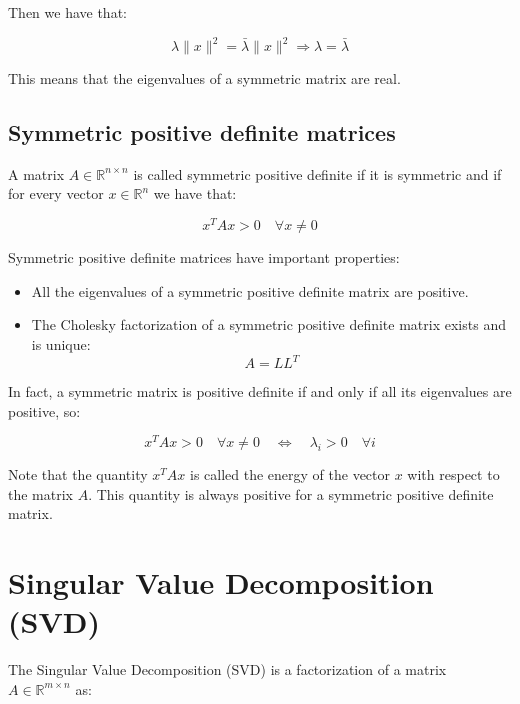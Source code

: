 Then we have that:

\begin{equation}
    \lambda \|x\|^2 = \bar{\lambda} \|x\|^2 \Rightarrow \lambda = \bar{\lambda}
\end{equation}

This means that the eigenvalues of a symmetric matrix are real.

\subsection{Symmetric positive definite matrices}

A matrix $A \in \mathbb{R}^{n \times n}$ is called symmetric positive definite if it is symmetric and if for every vector $x \in \mathbb{R}^n$
we have that:

\begin{equation}
    x^T A x > 0 \quad \forall x \neq 0
\end{equation}

Symmetric positive definite matrices have important properties:

\begin{itemize}
    \item All the eigenvalues of a symmetric positive definite matrix are positive.
    \item The Cholesky factorization of a symmetric positive definite matrix exists and is unique:
    \begin{equation}
        A = L L^T
    \end{equation}
\end{itemize}

In fact, a symmetric matrix is positive definite if and only if all its eigenvalues are positive, so:

\begin{equation}
    x^T A x > 0 \quad \forall x \neq 0 \quad \Leftrightarrow \quad \lambda_i > 0 \quad \forall i
\end{equation}

Note that the quantity $x^T A x$ is called the energy of the vector $x$ with respect to the matrix $A$. This quantity is always positive
for a symmetric positive definite matrix.\\


\section{Singular Value Decomposition (SVD)}

The Singular Value Decomposition (SVD) is a factorization of a matrix $A \in \mathbb{R}^{m \times n}$ as:

